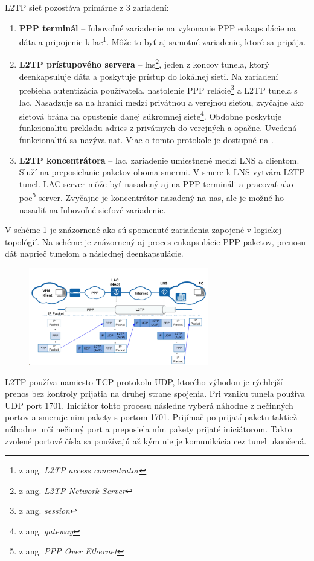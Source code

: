 L2TP sieť pozostáva primárne z 3 zariadení:
\begin{enumerate}
	\item{\textbf{PPP terminál}} -- ľubovoľné zariadenie na vykonanie PPP enkapsulácie na dáta a pripojenie k \acrshort{lac}\footnote{z ang. \textit{L2TP access concentrator}}. Môže to byť aj samotné zariadenie, ktoré sa pripája. 
	\item{\textbf{L2TP prístupového servera}} -- \acrshort{lns}\footnote{z ang. \textit{L2TP Network Server}}, jeden z koncov tunela, ktorý deenkapsuluje dáta a poskytuje prístup do lokálnej sieti. Na zariadení prebieha autentizácia používateľa, nastolenie PPP relácie\footnote{z ang. \textit{session}} a L2TP tunela s \acrshort{lac}. Nasadzuje sa na hranici medzi privátnou a verejnou sieťou, zvyčajne ako sieťová brána na opustenie danej súkromnej siete\footnote{z ang. \textit{gateway}}. Obdobne poskytuje funkcionalitu prekladu adries z privátnych do verejných a opačne. Uvedená funkcionalitá sa nazýva \acrfull{nat}. Viac o tomto protokole je dostupné na \cite{nat}.   
	\item{\textbf{L2TP koncentrátora}} -- \acrshort{lac}, zariadenie umiestnené medzi LNS a clientom. Služí na preposielanie paketov oboma smermi. V smere k LNS vytvára L2TP tunel. LAC server môže byť nasadený aj na PPP termináli a pracovať ako \acrshort{poe}\footnote{z ang. \textit{PPP Over Ethernet}} server. Zvyčajne je koncentrátor nasadený na \acrshort{nas}, ale je možné ho nasadiť na ľubovoľné sieťové zariadenie.
\end{enumerate}
V schéme \ref{l2tp} je znázornené ako sú spomenuté zariadenia zapojené v logickej topológií. Na schéme je znázornený aj proces enkapsulácie PPP paketov, prenosu dát naprieč tunelom a následnej deenkapsulácie. 
\begin{figure}
	\centering
	\includegraphics[width=0.7\textwidth]{figures/l2tp}
	\caption{}
	\label{l2tp}
\end{figure}

L2TP používa namiesto TCP protokolu UDP, ktorého výhodou je rýchlejší prenos bez kontroly prijatia na druhej strane spojenia.  
Pri vzniku tunela používa UDP port 1701. Iniciátor tohto procesu následne vyberá náhodne z nečinných portov a smeruje nim pakety s portom 1701. Prijímač po prijatí paketu taktiež náhodne určí nečinný port a preposiela ním pakety prijaté iniciátorom. Takto zvolené portové čísla sa používajú až kým nie je komunikácia cez tunel ukončená. 

